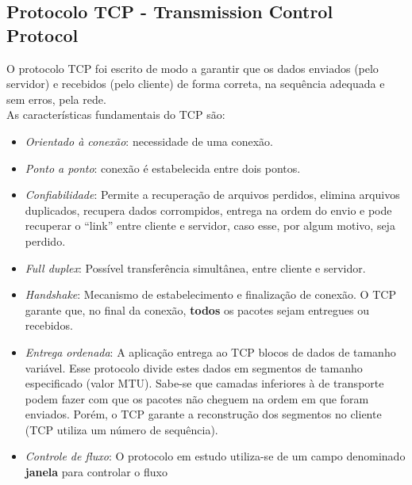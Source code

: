 \documentclass[a4paper,10pt]{article}
\begin{document}
\subsection{Protocolo TCP - Transmission Control Protocol}
O protocolo TCP foi escrito de modo a garantir que os dados enviados (pelo
servidor) e recebidos (pelo cliente) de forma correta, na sequência 
adequada e sem erros, pela rede.
\\As características fundamentais do TCP são:
\begin{itemize}
\item \emph{Orientado à conexão}: necessidade de uma conexão.
\item \emph{Ponto a ponto}: conexão é estabelecida entre dois pontos.
\item \emph{Confiabilidade}: Permite a recuperação de arquivos perdidos, elimina 
arquivos duplicados, recupera dados corrompidos, entrega na ordem do envio e 
pode recuperar o ``link'' entre cliente e servidor, caso esse, por algum motivo,
seja perdido.
\item \emph{Full duplex}: Possível transferência simultânea, entre cliente e 
servidor.
\item \emph{Handshake}: Mecanismo de estabelecimento e finalização de conexão.
O TCP garante que, no final da conexão, \textbf{todos} os pacotes sejam 
entregues ou recebidos.
\item \emph{Entrega ordenada}: A aplicação entrega ao TCP blocos de dados de 
tamanho variável. Esse protocolo divide estes dados em segmentos de tamanho 
especificado (valor MTU). Sabe-se que camadas inferiores à de transporte podem 
fazer com que os pacotes não cheguem na ordem em que foram enviados. Porém, o TCP
garante a reconstrução dos segmentos no cliente (TCP utiliza um número de 
sequência).
\item \emph{Controle de fluxo}: O protocolo em estudo utiliza-se de um campo 
denominado \textbf{janela} para controlar o fluxo
\end{itemize}
\end{document}
